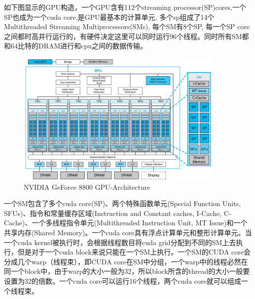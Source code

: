 \documentclass[12pt]{book}
\begin{document}
如下图显示的GPU构造，一个GPU含有112个streaming processor(SP)cores,一个SP也成为一个cuda core,是GPU最基本的计算单元, 多个sp组成了14个Multithreaded Streaming Multiprocessors(SMs), 每个SM有8个SP, 每一个SP core之间都时高并行运行的，有硬件决定这里可以同时运行96个线程。同时所有SM都和64比特的DRAM进行和cpu之间的数据传输。
\begin{figure}[H]
	\centering
	\includegraphics[width=0.9\textwidth]{images/basic-gpu-architecture.png}
	\caption{NVIDIA GeForce 8800 GPU-Architecture}
	\label{GPU-Architecture}
\end{figure}
一个SM包含了多个cuda core(SP)、两个特殊函数单元(Special Function Units, SFUs)、指令和常量缓存区域(Instruction and Constant caches, I-Cache, C-Cache)、一个多线程指令单元(Multithreaded Instruction Unit, MT Issue)和一个共享内存(Shared Memory)。一个cuda core具有浮点计算单元和整形计算单元。当一个cuda kernel被执行时，会根据线程数目将cuda grid分配到不同的SM上去执行，但是对于一个cuda block来说只能在一个SM上执行。一个SM的CUDA core会分成几个warp（线程束），即CUDA core在SM中分组，一个warp中的线程必然在同一个block中，由于warp的大小一般为32，所以block所含的thread的大小一般要设置为32的倍数。一个cuda core可以运行16个线程，两个cuda core就可以组成一个线程束。
\end{document}
